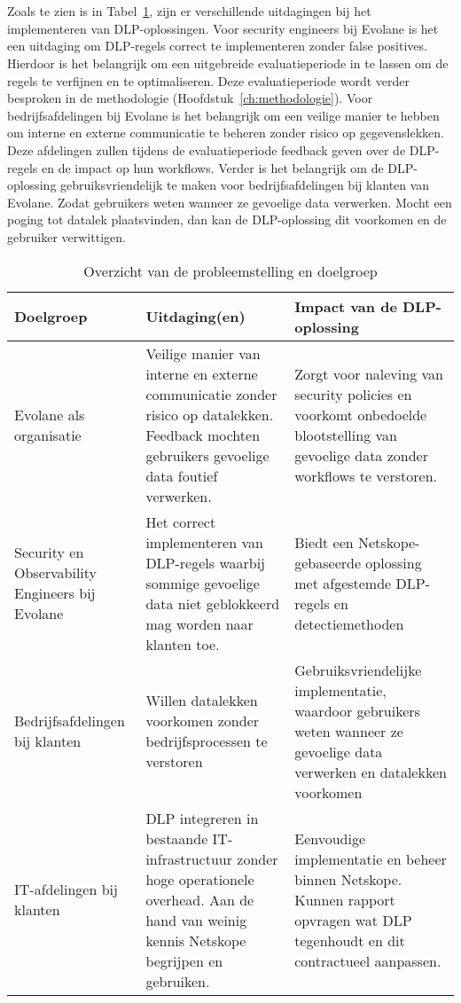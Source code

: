 \section{}%
\label{sec:probleemstelling}

Zoals te zien is in Tabel~\ref{tab:probleemstelling}, zijn er verschillende uitdagingen bij het implementeren van DLP-oplossingen. 
Voor security engineers bij Evolane is het een uitdaging om DLP-regels correct te implementeren zonder false positives. Hierdoor is het belangrijk om een uitgebreide evaluatieperiode in te lassen om de regels te verfijnen en te optimaliseren. 
Deze evaluatieperiode wordt verder besproken in de methodologie (Hoofdstuk~\ref{ch:methodologie}). 
Voor bedrijfsafdelingen bij Evolane is het belangrijk om een veilige manier te hebben om interne en externe communicatie te beheren zonder risico op gegevenslekken. 
Deze afdelingen zullen tijdens de evaluatieperiode feedback geven over de DLP-regels en de impact op hun workflows. 
Verder is het belangrijk om de DLP-oplossing gebruiksvriendelijk te maken voor bedrijfsafdelingen bij klanten van Evolane. 
Zodat gebruikers weten wanneer ze gevoelige data verwerken. Mocht een poging tot datalek plaatsvinden, dan kan de DLP-oplossing dit voorkomen en de gebruiker verwittigen.   

\begin{table}[h]
    \centering
    \small
    \begin{tabular}{p{4cm} p{5cm} p{6cm}}
        \toprule
        \textbf{Doelgroep} & \textbf{Uitdaging(en)} & \textbf{Impact van de DLP-oplossing} \\
        \midrule
        Evolane als organisatie & Veilige manier van interne en externe communicatie zonder risico op datalekken. Feedback mochten gebruikers gevoelige data foutief verwerken. & Zorgt voor naleving van security policies en voorkomt onbedoelde blootstelling van gevoelige data zonder workflows te verstoren. \\
        Security en Observability Engineers bij Evolane & Het correct implementeren van DLP-regels waarbij sommige gevoelige data niet geblokkeerd mag worden naar klanten toe. & Biedt een Netskope-gebaseerde oplossing met afgestemde DLP-regels en detectiemethoden \\ 
        Bedrijfsafdelingen bij klanten & Willen datalekken voorkomen zonder bedrijfsprocessen te verstoren & Gebruiksvriendelijke implementatie, waardoor gebruikers weten wanneer ze gevoelige data verwerken en datalekken voorkomen \\
        IT-afdelingen bij klanten & DLP integreren in bestaande IT-infrastructuur zonder hoge operationele overhead. Aan de hand van weinig kennis Netskope begrijpen en gebruiken. & Eenvoudige implementatie en beheer binnen Netskope. Kunnen rapport opvragen wat DLP tegenhoudt en dit contractueel aanpassen. \\
        \bottomrule
    \end{tabular}
    \caption{Overzicht van de probleemstelling en doelgroep}
    \label{tab:probleemstelling}
\end{table}

